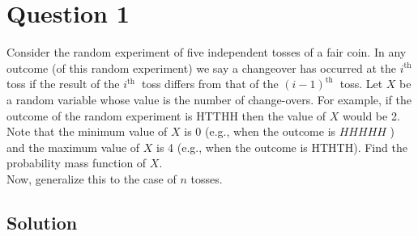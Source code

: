 \section*{Question 1}

Consider the random experiment of five independent tosses of a fair coin.
In any outcome (of this random experiment) we say a changeover has occurred at the \( i^{\text {th }} \) toss if the result of the \( i^{\text {th }} \) toss differs from that of the \( (i-1)^{\text {th }} \) toss.
Let \( X \) be a random variable whose value is the number of change-overs.
For example, if the outcome of the random experiment is HTTHH then the value of \( X \) would be 2.
Note that the minimum value of \( X \) is 0 (e.g., when the outcome is \( H H H H H \) ) and the maximum value of \( X \) is 4 (e.g., when the outcome is HTHTH).
Find the probability mass function of \( X \).\\
Now, generalize this to the case of \( n \) tosses.

\subsection*{Solution}
